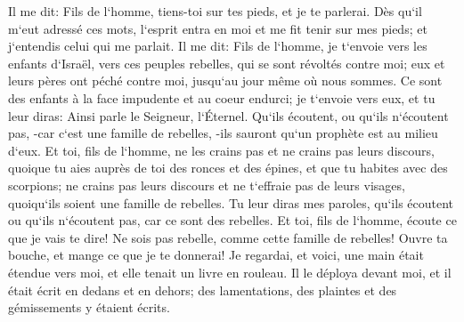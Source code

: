 \verse Il me dit: Fils de l`homme, tiens-toi sur tes pieds, et je te parlerai. 
\verse Dès qu`il m`eut adressé ces mots, l`esprit entra en moi et me fit tenir sur mes pieds; et j`entendis celui qui me parlait. 
\verse Il me dit: Fils de l`homme, je t`envoie vers les enfants d`Israël, vers ces peuples rebelles, qui se sont révoltés contre moi; eux et leurs pères ont péché contre moi, jusqu`au jour même où nous sommes. 
\verse Ce sont des enfants à la face impudente et au coeur endurci; je t`envoie vers eux, et tu leur diras: Ainsi parle le Seigneur, l`Éternel. 
\verse Qu`ils écoutent, ou qu`ils n`écoutent pas, -car c`est une famille de rebelles, -ils sauront qu`un prophète est au milieu d`eux. 
\verse Et toi, fils de l`homme, ne les crains pas et ne crains pas leurs discours, quoique tu aies auprès de toi des ronces et des épines, et que tu habites avec des scorpions; ne crains pas leurs discours et ne t`effraie pas de leurs visages, quoiqu`ils soient une famille de rebelles. 
\verse Tu leur diras mes paroles, qu`ils écoutent ou qu`ils n`écoutent pas, car ce sont des rebelles. 
\verse Et toi, fils de l`homme, écoute ce que je vais te dire! Ne sois pas rebelle, comme cette famille de rebelles! Ouvre ta bouche, et mange ce que je te donnerai! 
\verse Je regardai, et voici, une main était étendue vers moi, et elle tenait un livre en rouleau. 
\verse Il le déploya devant moi, et il était écrit en dedans et en dehors; des lamentations, des plaintes et des gémissements y étaient écrits. 

\chapter{}

